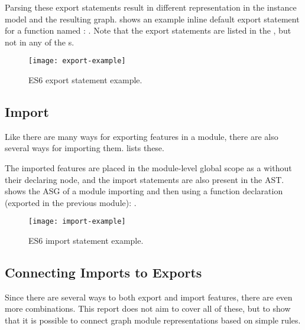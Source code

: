 Parsing these export statements result in different representation in the instance model and the resulting graph.  shows an example inline default export statement for a function named : . Note that the export statements are listed in the , but not in any of the s.

\begin{figure}[htbp]
  \centering
  \texttt{[image: export-example]}
  \caption{ES6 export statement example.}
  \label{fig:es6-export-example}
\end{figure}


\subsection{Import}
Like there are many ways for exporting features in a module, there are also several ways for importing them.  lists these.

\begin{figure}[htbp]
	\begin{minipage}{\textwidth}
		
	\end{minipage}
\end{figure}

The imported features are placed in the module-level global scope as a  without their declaring node, and the import statements are also present in the AST.  shows the ASG of a module importing and then using a function declaration (exported in the previous module): .

\begin{figure}[htbp]
  \centering
  \texttt{[image: import-example]}
  \caption{ES6 import statement example.}
  \label{fig:es6-import-example}
\end{figure}

\subsection{Connecting Imports to Exports}
Since there are several ways to both export and import features, there are even more combinations. This report does not aim to cover all of these, but to show that it is possible to connect graph module representations based on simple rules.

